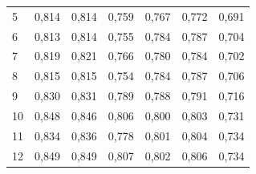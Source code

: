 \begin{table}[]
\begin{tabular}{l|l|l|l|l|l|l}
		5 &          0,814 &       0,814 &       0,759 &                     0,767 &                  0,772 &                  0,691 \\
		6 &          0,813 &       0,814 &       0,755 &                     0,784 &                  0,787 &                  0,704 \\
		7 &          0,819 &       0,821 &       0,766 &                     0,780 &                  0,784 &                  0,702 \\
		8 &          0,815 &       0,815 &       0,754 &                     0,784 &                  0,787 &                  0,706 \\
		9 &          0,830 &       0,831 &       0,789 &                     0,788 &                  0,791 &                  0,716 \\
		10 &          0,848 &       0,846 &       0,806 &                     0,800 &                  0,803 &                  0,731 \\
		11 &          0,834 &       0,836 &       0,778 &                     0,801 &                  0,804 &                  0,734 \\
		12 &          0,849 &       0,849 &       0,807 &                     0,802 &                  0,806 &                  0,734 \\
	\end{tabular}
	\label{tbl:3rd_sample_f1}
\end{table}

